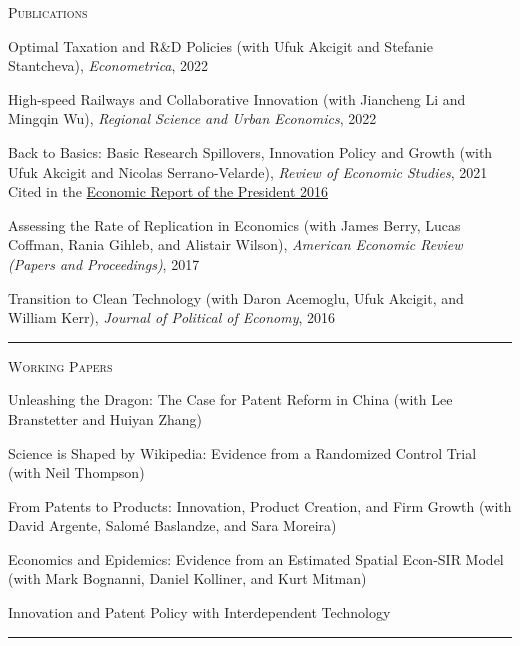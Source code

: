 \documentclass{article}
\begin{document}
\parbox{\textwidth}{
\parbox[t]{0.28\textwidth}{ \raggedright \noindent \textsc{ Publications } }
\parbox[t]{0.72\textwidth}{ \raggedright

Optimal Taxation and R\&D Policies (with Ufuk Akcigit and Stefanie Stantcheva), \textit{Econometrica}, 2022
\vspace{0.27cm}

High-speed Railways and Collaborative Innovation (with Jiancheng Li and Mingqin Wu), \textit{Regional Science and Urban Economics}, 2022
\vspace{0.27cm}

Back to Basics: Basic Research Spillovers, Innovation Policy and Growth (with Ufuk Akcigit and Nicolas Serrano-Velarde), \textit{Review of Economic Studies}, 2021  \\
 Cited in the \href{https://www.gpo.gov/fdsys/pkg/ERP-2016/pdf/ERP-2016.pdf}{Economic Report of the President 2016}
\vspace{0.27cm}

Assessing the Rate of Replication in Economics (with James Berry, Lucas Coffman, Rania Gihleb, and Alistair Wilson), \textit{American Economic Review (Papers and Proceedings)}, 2017
\vspace{0.27cm}

Transition to Clean Technology (with Daron Acemoglu, Ufuk Akcigit, and William Kerr), \textit{Journal of Political of Economy}, 2016
\vspace{0.27cm}

}
\textcolor{light-gray}{\hrule}
}
\vspace{0.3cm}

\parbox{\textwidth}{
\parbox[t]{0.28\textwidth}{ \raggedright \noindent \textsc{ Working Papers } }
\parbox[t]{0.72\textwidth}{ \raggedright

Unleashing the Dragon: The Case for Patent Reform in China (with Lee Branstetter and Huiyan Zhang)
\vspace{0.27cm}

Science is Shaped by Wikipedia: Evidence from a Randomized Control Trial (with Neil Thompson)
\vspace{0.27cm}

From Patents to Products: Innovation, Product Creation, and Firm Growth (with David Argente, Salomé Baslandze, and Sara Moreira)
\vspace{0.27cm}

Economics and Epidemics: Evidence from an Estimated Spatial Econ-SIR Model (with Mark Bognanni, Daniel Kolliner, and Kurt Mitman)
\vspace{0.27cm}

Innovation and Patent Policy with Interdependent Technology
\vspace{0.27cm}

}
\textcolor{light-gray}{\hrule}
}
\vspace{0.3cm}
\end{document}
